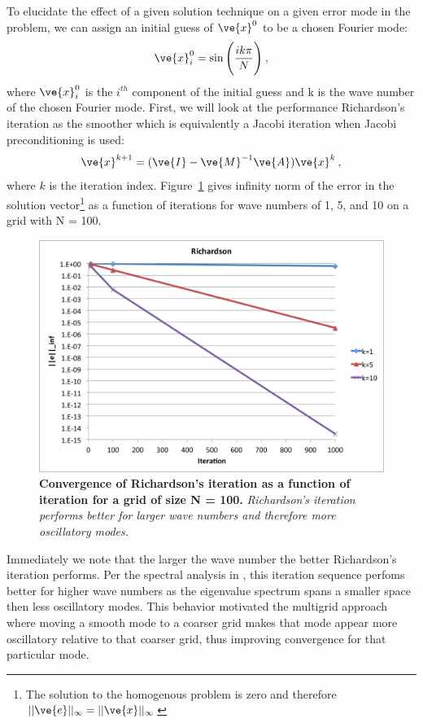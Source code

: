 \documentclass[note]{TechNote}
\begin{document}
To elucidate the effect of a given solution technique on a given error
mode in the problem, we can assign an initial guess of $\ve{x}^0$ to
be a chosen Fourier mode:
\begin{equation}
  \ve{x}^0_i = \sin\Bigg( \frac{ik\pi}{N} \Bigg)\:,
  \label{eq:fourier_mode}
\end{equation}
where $\ve{x}^0_i$ is the $i^{th}$ component of the initial guess and
k is the wave number of the chosen Fourier mode. First, we will look at
the performance Richardson's iteration as the smoother which is
equivalently a Jacobi iteration when Jacobi preconditioning is used:
\begin{equation}
  \ve{x}^{k+1} = (\ve{I}-\ve{M}^{-1}\ve{A})\ve{x}^k\:,
\end{equation}
where $k$ is the iteration index. Figure~\ref{fig:richardson} gives
infinity norm of the error in the solution vector\footnote{The
  solution to the homogenous problem is zero and therefore
  $||\ve{e}||_{\infty} = ||\ve{x}||_{\infty}$} as a function of
iterations for wave numbers of 1, 5, and 10 on a grid with N = 100.
\begin{figure}[h!]
  \begin{center}
    \includegraphics[width=5in]{richardson.png}
  \end{center}
  \caption{\textbf{Convergence of Richardson's iteration as a function
      of iteration for a grid of size N = 100.} \textit{Richardson's
      iteration performs better for larger wave numbers and therefore
      more oscillatory modes.}}
  \label{fig:richardson}
\end{figure}
Immediately we note that the larger the wave number the better
Richardson's iteration performs. Per the spectral analysis in
\cite{briggs_multigrid}, this iteration sequence perfoms better for
higher wave numbers as the eigenvalue spectrum spans a smaller space
then less oscillatory modes. This behavior motivated the multigrid
approach where moving a smooth mode to a coarser grid makes that mode
appear more oscillatory relative to that coarser grid, thus improving
convergence for that particular mode.
\end{document}
